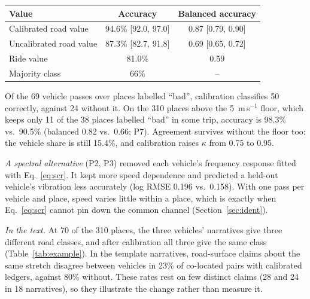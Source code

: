 \begin{center}
\scriptsize
\setlength{\tabcolsep}{3pt}
\begin{tabular}{@{}lcc@{}}
\toprule
Value & Accuracy & Balanced accuracy \\
\midrule
Calibrated road value & 94.6\% [92.0, 97.0] & 0.87 [0.79, 0.90] \\
Uncalibrated road value & 87.3\% [82.7, 91.8] & 0.69 [0.65, 0.72] \\
Ride value & 81.0\% & 0.59 \\
Majority class & 66\% & -- \\
\bottomrule
\end{tabular}
\end{center}

Of the 69 vehicle passes over places labelled ``bad'', calibration classifies 50 correctly, against 24 without it.
On the 310 places above the 5~m\,s$^{-1}$ floor, which keeps only 11 of the 38 places labelled ``bad'' in some trip, accuracy is 98.3\% vs.\ 90.5\% (balanced 0.82 vs.\ 0.66; P7).
Agreement survives without the floor too: the vehicle share is still 15.4\%, and calibration raises $\kappa$ from 0.75 to 0.95.

\emph{A spectral alternative} (P2, P3) removed each vehicle's frequency response fitted with Eq.~\eqref{eq:scr}. It kept more speed dependence and predicted a held-out vehicle's vibration less accurately (log RMSE 0.196 vs.\ 0.158).
With one pass per vehicle and place, speed varies little within a place, which is exactly when Eq.~\eqref{eq:scr} cannot pin down the common channel (Section~\ref{sec:ident}).

\emph{In the text.}
At 70 of the 310 places, the three vehicles' narratives give three different road classes, and after calibration all three give the same class (Table~\ref{tab:example}).
In the template narratives, road-surface claims about the same stretch disagree between vehicles in 23\% of co-located pairs with calibrated ledgers, against 80\% without. These rates rest on few distinct claims (28 and 24 in 18 narratives), so they illustrate the change rather than measure it.

